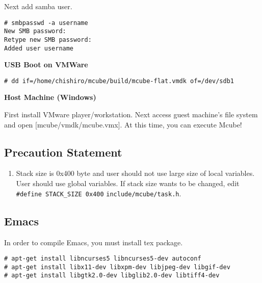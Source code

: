 Next add samba user.

\noindent
\begin{Sbox}
\begin{minipage}[t]{0.975\linewidth}
\begin{verbatim}
# smbpasswd -a username
New SMB password:
Retype new SMB password:
Added user username
\end{verbatim}
\end{minipage}
\end{Sbox}
\fbox{\TheSbox}


\textbf{USB Boot on VMWare}


\noindent
\begin{Sbox}
\begin{minipage}[t]{0.975\linewidth}
\begin{verbatim}
# dd if=/home/chishiro/mcube/build/mcube-flat.vmdk of=/dev/sdb1
\end{verbatim}
\end{minipage}
\end{Sbox}
\fbox{\TheSbox}



\textbf{Host Machine (Windows)}

First install VMware player/workstation.
Next access guest machine's file system and open [mcube/vmdk/mcube.vmx].
At this time, you can execute Mcube!



\subsection{Precaution Statement}

\begin{enumerate}
 \setlength{\parskip}{0cm}
 \setlength{\itemsep}{0cm}
 \item Stack size is 0x400 byte and user should not use large size of
   local variables.
   User should use global variables.
   If stack size wants to be changed, edit
   \verb|#define STACK_SIZE 0x400| \verb|include/mcube/task.h|.
\end{enumerate}

\subsection{Emacs}

In order to compile Emacs, you must install tex package.

\noindent
\begin{Sbox}
\begin{minipage}[t]{0.975\linewidth}
\begin{verbatim}
# apt-get install libncurses5 libncurses5-dev autoconf
# apt-get install libx11-dev libxpm-dev libjpeg-dev libgif-dev
# apt-get install libgtk2.0-dev libglib2.0-dev libtiff4-dev
\end{verbatim}
\end{minipage}
\end{Sbox}
\fbox{\TheSbox}


